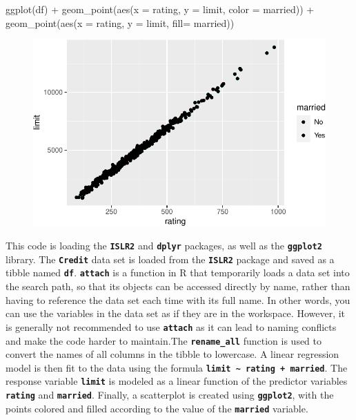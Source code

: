 \documentclass[
  letterpaper,
  DIV=11,
  numbers=noendperiod]{scrartcl}
\newenvironment{Shaded}{\begin{snugshade}}{\end{snugshade}}
\newcommand{\AttributeTok}[1]{\textcolor[rgb]{0.40,0.45,0.13}{#1}}
\newcommand{\FunctionTok}[1]{\textcolor[rgb]{0.28,0.35,0.67}{#1}}
\newcommand{\NormalTok}[1]{\textcolor[rgb]{0.00,0.23,0.31}{#1}}
\newcommand{\SpecialCharTok}[1]{\textcolor[rgb]{0.37,0.37,0.37}{#1}}
\begin{document}
\begin{Shaded}
\begin{Highlighting}[]
\FunctionTok{ggplot}\NormalTok{(df) }\SpecialCharTok{+} 
      \FunctionTok{geom\_point}\NormalTok{(}\FunctionTok{aes}\NormalTok{(}\AttributeTok{x =}\NormalTok{ rating, }\AttributeTok{y =}\NormalTok{ limit, }\AttributeTok{color =}\NormalTok{ married)) }\SpecialCharTok{+}
      \FunctionTok{geom\_point}\NormalTok{(}\FunctionTok{aes}\NormalTok{(}\AttributeTok{x =}\NormalTok{ rating, }\AttributeTok{y =}\NormalTok{ limit, }\AttributeTok{fill=}\NormalTok{ married))}
\end{Highlighting}
\end{Shaded}

\begin{figure}[H]

{\centering \includegraphics{index_files/figure-pdf/unnamed-chunk-18-1.pdf}

}

\end{figure}

This code is loading the \textbf{\texttt{ISLR2}} and
\textbf{\texttt{dplyr}} packages, as well as the
\textbf{\texttt{ggplot2}} library. The \textbf{\texttt{Credit}} data set
is loaded from the \textbf{\texttt{ISLR2}} package and saved as a tibble
named \textbf{\texttt{df}}. \textbf{\texttt{attach}} is a function in R
that temporarily loads a data set into the search path, so that its
objects can be accessed directly by name, rather than having to
reference the data set each time with its full name. In other words, you
can use the variables in the data set as if they are in the workspace.
However, it is generally not recommended to use \textbf{\texttt{attach}}
as it can lead to naming conflicts and make the code harder to
maintain.The \textbf{\texttt{rename\_all}} function is used to convert
the names of all columns in the tibble to lowercase. A linear regression
model is then fit to the data using the formula
\textbf{\texttt{limit\ \textasciitilde{}\ rating\ +\ married}}. The
response variable \textbf{\texttt{limit}} is modeled as a linear
function of the predictor variables \textbf{\texttt{rating}} and
\textbf{\texttt{married}}. Finally, a scatterplot is created using
\textbf{\texttt{ggplot2}}, with the points colored and filled according
to the value of the \textbf{\texttt{married}} variable.
\end{document}
